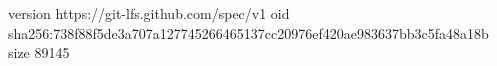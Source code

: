 version https://git-lfs.github.com/spec/v1
oid sha256:738f88f5de3a707a127745266465137cc20976ef420ae983637bb3c5fa48a18b
size 89145
